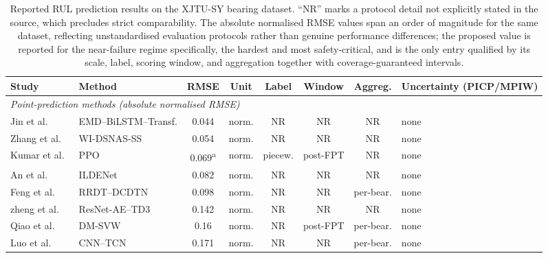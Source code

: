 
\begin{table}[!htbp]
\centering
\caption{Reported RUL prediction results on the XJTU-SY bearing
dataset. ``NR'' marks a protocol detail not explicitly stated in the
source, which precludes strict comparability. The absolute normalised
RMSE values span an order of magnitude for the same dataset,
reflecting unstandardised evaluation protocols rather than genuine
performance differences; the proposed value is reported for the
near-failure regime specifically, the hardest and most safety-critical,
and is the only entry qualified by its scale, label, scoring window,
and aggregation together with coverage-guaranteed intervals.}
\label{tab:benchmark}
\footnotesize
\renewcommand{\arraystretch}{1.15}
\setlength{\tabcolsep}{3pt}
\begin{tabular}{llcccccl}
\toprule
\textbf{Study} & \textbf{Method} & \textbf{RMSE} & \textbf{Unit} &
\textbf{Label} & \textbf{Window} & \textbf{Aggreg.} &
\textbf{Uncertainty (PICP/MPIW)} \\
\midrule
\multicolumn{8}{l}{\textit{Point-prediction methods (absolute normalised RMSE)}}\\
Jin et al.~\cite{app15179529}        & EMD--BiLSTM--Transf. & 0.044 & norm. & NR & NR & NR & none \\
Zhang et al.~\cite{11682466}         & WI-DSNAS-SS          & 0.054 & norm. & NR & NR & NR & none \\
Kumar et al.~\cite{machines14060672} & PPO                  & 0.069\textsuperscript{a} & norm. & piecew. & post-FPT & NR & none \\
An et al.~\cite{10935355}            & ILDENet              & 0.082 & norm. & NR & NR & NR & none \\
Feng et al.~\cite{FENG2026105865}    & RRDT--DCDTN          & 0.098 & norm. & NR & NR & per-bear. & none \\
zheng et al.~\cite{10423873}         & ResNet-AE--TD3       & 0.142 & norm. & NR & NR & NR & none \\
Qiao et al.~\cite{QIAO2026112248}    & DM-SVW               & 0.16  & norm. & NR & post-FPT & per-bear. & none \\
Luo et al.~\cite{11637655}           & CNN--TCN             & 0.171 & norm. & NR & NR & per-bear. & none \\

\end{tabular}
\end{table}
